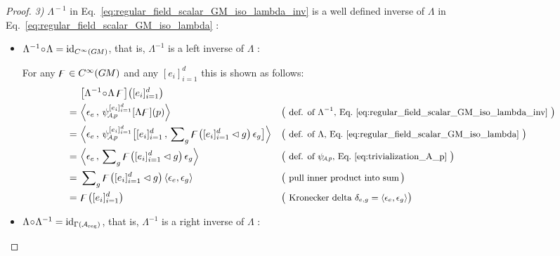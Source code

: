 \begin{proof}
    \item[] {\textit{3)} $\Lambda^{\!-1}$ in Eq.~\eqref{eq:regular_field_scalar_GM_iso_lambda_inv} is a well defined inverse of $\Lambda$ in Eq.~\eqref{eq:regular_field_scalar_GM_iso_lambda} : }

    \begin{itemize}[leftmargin=1.1cm]
    \setlength\itemsep{2ex}

        \item[\it 3\hspace{1pt}a)]
            $\Lambda^{-1} \!\circ\! \Lambda = \mathrm{id}_{C^\infty(G\mkern-1.4muM)}$,
            that is, $\Lambda^{-1}$ is a left inverse of $\Lambda$ :

            For any $\digamma\in C^{\infty}(G\mkern-1.4muM)$ and any $[e_i]_{i=1}^d$ this is shown as follows:
            \begin{align}
                &\ \big[\Lambda^{-1} \!\circ\! \Lambda\, \digamma \big] \big( [e_i]_{i=1}^d \big) \notag \\
                \ =&\ \Big\langle \epsilon_e \,,\, \psiAp^{[e_i]_{i=1}^d} [\Lambda\digamma](p) \Big\rangle
                    && \big( \text{\small def. of $\Lambda^{-1}$, Eq.~\eqref{eq:regular_field_scalar_GM_iso_lambda_inv} } \big) \notag\\
                \ =&\ \Big\langle \epsilon_e \,,\, \psiAp^{[e_i]_{i=1}^d} \big[ [e_i]_{i=1}^d \,,\, \sum\nolimits_g \digamma\big( [e_i]_{i=1}^d \lhd g \big)\, \epsilon_g \big] \Big\rangle
                    && \big( \text{\small def. of $\Lambda$, Eq.~\eqref{eq:regular_field_scalar_GM_iso_lambda} } \big) \notag\\
                \ =&\ \Big\langle \epsilon_e \,,\, \sum\nolimits_g \digamma\big( [e_i]_{i=1}^d \lhd g \big)\, \epsilon_g \Big\rangle
                    && \big( \text{\small def. of $\psiAp$, Eq.~\eqref{eq:trivialization_A_p} } \big) \notag\\
                \ =&\ \sum\nolimits_g \digamma\big( [e_i]_{i=1}^d \lhd g \big)\,
                    \langle \epsilon_e, \epsilon_g \rangle
                    && \big( \text{\small pull inner product into sum\,} \big) \notag\\
                \ =&\ \digamma\big( [e_i]_{i=1}^d \big)
                    && \big( \text{\small Kronecker delta $\delta_{e,g} = \langle \epsilon_e, \epsilon_g \rangle$} \big) \notag\\
            \end{align}



        \item[\it 3\hspace{1pt}b)]
            $\Lambda \!\circ\! \Lambda^{-1} = \mathrm{id}_{\Gamma(\mathcal{A}_{\textup{reg}})}$,
            that is, $\Lambda^{-1}$ is a right inverse of $\Lambda$ :


\end{itemize}
\end{proof}
